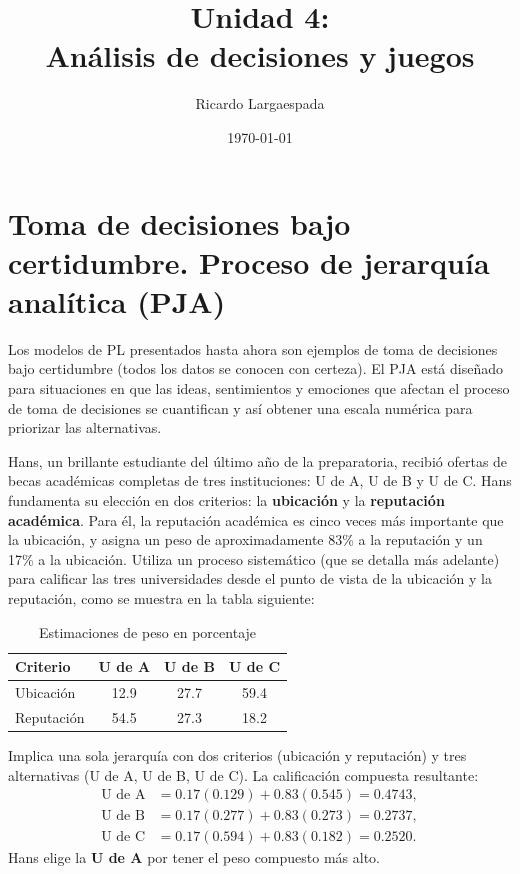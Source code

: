 \documentclass[11pt]{scrartcl}
\title{Unidad 4:\\Análisis de decisiones y juegos}
\author{Ricardo Largaespada}
\date{\today}
\begin{document}
\maketitle

\section{Toma de decisiones bajo certidumbre. Proceso de jerarquía analítica (PJA)}
Los modelos de PL presentados hasta ahora son ejemplos de toma de decisiones bajo certidumbre (todos los datos se conocen con certeza). El PJA está diseñado para situaciones en que las ideas, sentimientos y emociones que afectan el proceso de toma de decisiones se cuantifican y así obtener una escala numérica para priorizar las alternativas.

\begin{example}
Hans, un brillante estudiante del último año de la preparatoria, recibió ofertas de becas académicas completas de tres instituciones: U de A, U de B y U de C. Hans fundamenta su elección en dos criterios: la \textbf{ubicación} y la \textbf{reputación académica}. Para él, la reputación académica es cinco veces más importante que la ubicación, y asigna un peso de aproximadamente 83\% a la reputación y un 17\% a la ubicación. Utiliza un proceso sistemático (que se detalla más adelante) para calificar las tres universidades desde el punto de vista de la ubicación y la reputación, como se muestra en la tabla siguiente:
\end{example}
\begin{table}[H]
\centering
\caption*{Estimaciones de peso en porcentaje}
\begin{tabular}{@{}lccc@{}}
\toprule
\textbf{Criterio} & \textbf{U de A} & \textbf{U de B} & \textbf{U de C}\\ \midrule
Ubicación & 12.9 & 27.7 & 59.4\\
Reputación & 54.5 & 27.3 & 18.2\\ \bottomrule
\end{tabular}
\end{table}

Implica una sola jerarquía con dos criterios (ubicación y reputación) y tres alternativas (U de A, U de B, U de C). La calificación compuesta resultante:
\begin{align*}
\text{U de A}&=0.17(0.129)+0.83(0.545)=0.4743,\\
\text{U de B}&=0.17(0.277)+0.83(0.273)=0.2737,\\
\text{U de C}&=0.17(0.594)+0.83(0.182)=0.2520.
\end{align*}
Hans elige la \textbf{U de A} por tener el peso compuesto más alto.
\end{document}
